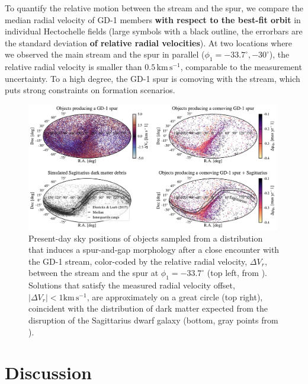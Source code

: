 \documentclass[twocolumn]{aastex63}
\newcommand{\kms}{\ensuremath{\textrm{km}\,\textrm{s}^{-1}}}
\newcommand{\changes}[1]{{\textbf{#1}}}
\begin{document}
To quantify the relative motion between the stream and the spur, we compare the median radial velocity of GD-1 members \changes{with respect to the best-fit orbit} in individual Hectochelle fields (large symbols with a black outline, the errorbars are the standard deviation \changes{of relative radial velocities}).
At two locations where we observed the main stream and the spur in parallel ($\phi_1=-33.7^\circ, -30^\circ$), the relative radial velocity is smaller than $0.5\,\kms$, comparable to the measurement uncertainty.
To a high degree, the GD-1 spur is comoving with the stream, which puts strong constraints on formation scenarios.


\begin{figure}
\begin{center}
\includegraphics[width=0.99\textwidth]{skybox.pdf}
\end{center}
\caption{Present-day sky positions of objects sampled from a distribution that induces a spur-and-gap morphology after a close encounter with the GD-1 stream, color-coded by the relative radial velocity, $\Delta V_r$, between the stream and the spur at $\phi_1=-33.7^\circ$ (top left, from \citealt{bonaca2019a}).
Solutions that satisfy the measured radial velocity offset, $|\Delta V_r|<1\kms$, are approximately on a great circle (top right), coincident with the distribution of dark matter expected from the disruption of the Sagittarius dwarf galaxy (bottom, gray points from \citealt{dl2017}).
}
\label{fig:skybox}
\end{figure}

\section{Discussion}
\label{sec:discussion}
\end{document}
